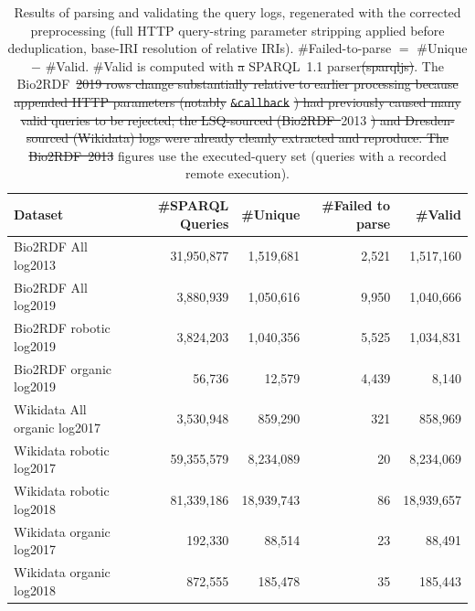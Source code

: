 \documentclass[sw]{iosart2x}
\providecommand{\DIFadd}[1]{{\protect\color{blue}\uwave{#1}}} %
\providecommand{\DIFdel}[1]{{\protect\color{red}\sout{#1}}} %
\providecommand{\DIFaddFL}[1]{\DIFadd{#1}} %
\providecommand{\DIFdelFL}[1]{\DIFdel{#1}} %
\providecommand{\DIFaddbeginFL}{} %
\providecommand{\DIFaddendFL}{} %
\providecommand{\DIFdelbeginFL}{} %
\providecommand{\DIFdelendFL}{} %
\providecommand{\DIFscaledelfig}{0.5}
\newlength{\DIFdelgraphicswidth} %
\newlength{\DIFdelgraphicsheight} %
\providecommand{\DIFaddincludegraphics}[2][]{{\color{blue}\fbox{\DIFOincludegraphics[#1]{#2}}}} %
\providecommand{\DIFdelincludegraphics}[2][]{%
\sbox{\DIFdelgraphicsbox}{\DIFOincludegraphics[#1]{#2}}%
\settoboxwidth{\DIFdelgraphicswidth}{\DIFdelgraphicsbox} %
\settoboxtotalheight{\DIFdelgraphicsheight}{\DIFdelgraphicsbox} %
\scalebox{\DIFscaledelfig}{%
\parbox[b]{\DIFdelgraphicswidth}{\usebox{\DIFdelgraphicsbox}\\[-\baselineskip] \rule{\DIFdelgraphicswidth}{0em}}\llap{\resizebox{\DIFdelgraphicswidth}{\DIFdelgraphicsheight}{%
\setlength{\unitlength}{\DIFdelgraphicswidth}%
\begin{picture}(1,1)%
\thicklines\linethickness{2pt} %
{\color[rgb]{1,0,0}\put(0,0){\framebox(1,1){}}}%
{\color[rgb]{1,0,0}\put(0,0){\line( 1,1){1}}}%
{\color[rgb]{1,0,0}\put(0,1){\line(1,-1){1}}}%
\end{picture}%
}\hspace*{3pt}}} %
} %
\DeclareRobustCommand{\DIFaddbeginFL}{\DIFOaddbeginFL \let\includegraphics\DIFaddincludegraphics} %
\DeclareRobustCommand{\DIFaddendFL}{\DIFOaddendFL \let\includegraphics\DIFOincludegraphics} %
\DeclareRobustCommand{\DIFdelbeginFL}{\DIFOdelbeginFL \let\includegraphics\DIFdelincludegraphics} %
\DeclareRobustCommand{\DIFdelendFL}{\DIFOaddendFL \let\includegraphics\DIFOincludegraphics} %
\begin{document}




\begin{table}[ht]
\centering
\caption{Results of parsing and validating the query logs, regenerated with the
corrected preprocessing (full HTTP query-string parameter stripping applied before
deduplication, base-IRI resolution of relative IRIs). \#Failed-to-parse $=$ \#Unique
$-$ \#Valid. \#Valid is computed with \DIFdelbeginFL \DIFdelFL{a }\DIFdelendFL \DIFaddbeginFL \DIFaddFL{the }\texttt{\DIFaddFL{sparqljs}} \DIFaddendFL SPARQL~1.1 parser\DIFdelbeginFL \DIFdelFL{(sparqljs)}\DIFdelendFL .
The Bio2RDF~\DIFdelbeginFL \DIFdelFL{2019
rows change substantially relative to earlier processing because appended HTTP
parameters (notably }\texttt{\DIFdelFL{\&callback}}%
\DIFdelFL{) had previously caused many valid queries to be
rejected; the LSQ-sourced (Bio2RDF~}\DIFdelendFL 2013 \DIFdelbeginFL \DIFdelFL{) and Dresden-sourced (Wikidata) logs were
already cleanly extracted and reproduce. The Bio2RDF~2013 }\DIFdelendFL figures use the executed-query set (queries with a recorded remote
execution).}
\label{tab:2}
\begin{tabular}{l|r|r|r|r}
\hline
Dataset & \#SPARQL Queries & \#Unique & \#Failed to parse & \#Valid \\
\hline
Bio2RDF All log2013 & 31,950,877 & 1,519,681 & 2,521 & 1,517,160 \\
Bio2RDF All log2019 & 3,880,939 & 1,050,616 & 9,950 & 1,040,666 \\
Bio2RDF robotic log2019 & 3,824,203 & 1,040,356 & 5,525 & 1,034,831 \\
Bio2RDF organic log2019 & 56,736 & 12,579 & 4,439 & 8,140 \\
Wikidata All organic log2017 & 3,530,948 & 859,290 & 321 & 858,969 \\
Wikidata robotic log2017 & 59,355,579 & 8,234,089 & 20 & 8,234,069 \\
Wikidata robotic log2018 & 81,339,186 & 18,939,743 & 86 & 18,939,657 \\
Wikidata organic log2017 & 192,330 & 88,514 & 23 & 88,491 \\
Wikidata organic log2018 & 872,555 & 185,478 & 35 & 185,443 \\
\hline
\end{tabular}
\end{table}
\end{document}
